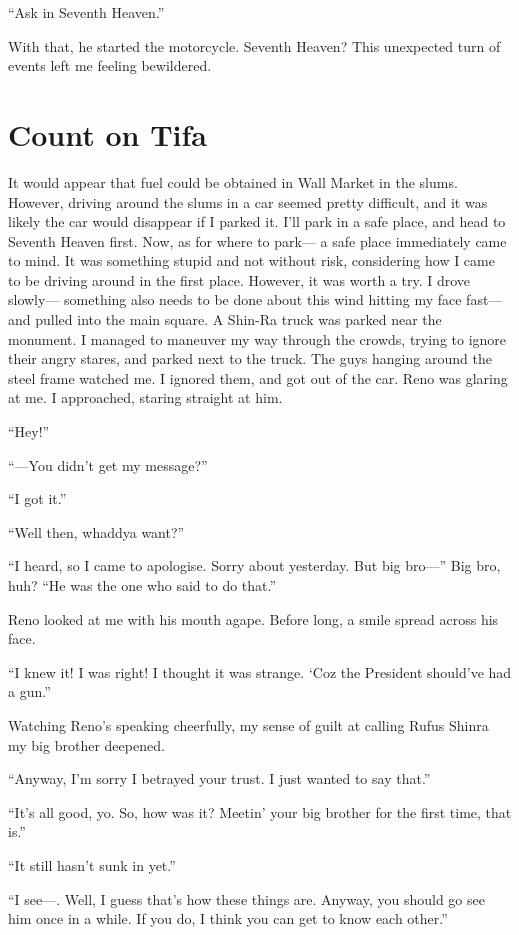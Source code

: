\documentclass[oneside]{book}
\begin{document}
“Ask in Seventh Heaven.”

With that, he started the motorcycle. Seventh Heaven? This unexpected turn of events left me feeling bewildered.

\chapter{Count on Tifa}
It would appear that fuel could be obtained in Wall Market in the slums. However, driving around the slums in a car seemed pretty difficult, and it was likely the car would disappear if I parked it. I’ll park in a safe place, and head to Seventh Heaven first. Now, as for where to park— a safe place immediately came to mind. It was something stupid and not without risk, considering how I came to be driving around in the first place. However, it was worth a try. I drove slowly— something also needs to be done about this wind hitting my face fast— and pulled into the main square. A Shin-Ra truck was parked near the monument. I managed to maneuver my way through the crowds, trying to ignore their angry stares, and parked next to the truck. The guys hanging around the steel frame watched me. I ignored them, and got out of the car. Reno was glaring at me. I approached, staring straight at him.

“Hey!”

“—You didn’t get my message?”

“I got it.”

“Well then, whaddya want?”

“I heard, so I came to apologise. Sorry about yesterday. But big bro—” Big bro, huh? “He was the one who said to do that.”

Reno looked at me with his mouth agape. Before long, a smile spread across his face.

“I knew it! I was right! I thought it was strange. ‘Coz the President should’ve had a gun.”

Watching Reno’s speaking cheerfully, my sense of guilt at calling Rufus Shinra my big brother deepened.

“Anyway, I’m sorry I betrayed your trust. I just wanted to say that.”

“It’s all good, yo. So, how was it? Meetin’ your big brother for the first time, that is.”

“It still hasn’t sunk in yet.”

“I see—. Well, I guess that’s how these things are. Anyway, you should go see him once in a while. If you do, I think you can get to know each other.”
\end{document}
